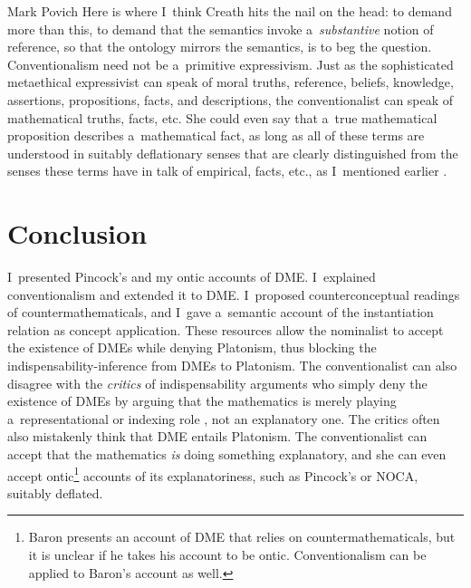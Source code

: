 \begin{artengenv}{Mark Povich}
Here is where I~think Creath
\parencite*[][]{creath_benacerraf_1980} %
 hits the nail on the head: to demand more than this, to demand that the semantics invoke a~\textit{substantive} notion of reference, so that the ontology mirrors the semantics, is to beg the question. Conventionalism need not be a~primitive expressivism. Just as the sophisticated metaethical expressivist 
\parencites[e.g.,][]{blackburn_essays_1993}{kalderon_quasi-realism_2005}
 can speak of moral truths, reference, beliefs, knowledge, assertions, propositions, facts, and descriptions, the conventionalist can speak of mathematical truths, facts, etc. She could even say that a~true mathematical proposition describes a~mathematical fact, as long as all of these terms are understood in suitably deflationary senses that are clearly distinguished from the senses these terms have in talk of empirical, facts, etc., as I~mentioned earlier 
\parencites[][]{thomasson_norms_2020}[see also][]{baker_mathematical_2009}.%


\section{Conclusion}
I~presented Pincock's
\parencite*[][]{pincock_abstract_2015} %
 and my 
\parencite[][]{povich_narrow_2021} %
 ontic accounts of DME. I~explained conventionalism and extended it to DME. I~proposed counterconceptual readings of countermathematicals, and I~gave a~semantic account of the instantiation relation as concept application. These resources allow the nominalist to accept the existence of DMEs while denying Platonism, thus blocking the indispensability-inference from DMEs to Platonism. The conventionalist can also disagree with the \textit{critics} of indispensability arguments who simply deny the existence of DMEs by arguing that the mathematics is merely playing a~representational 
\parencite[][]{saatsi_enhanced_2011} %
 or indexing role 
\parencite[][]{melia_weaseling_2000}, %
 not an explanatory one. The critics often also mistakenly think that DME entails Platonism. The conventionalist can accept that the mathematics \textit{is} doing something explanatory, and she can even accept ontic\footnote{Baron 
\parencite*[][]{baron_counterfactual_2020} %
 presents an account of DME that relies on countermathematicals, but it is unclear if he takes his account to be ontic. Conventionalism can be applied to Baron's account as well.} accounts of its explanatoriness, such as Pincock's or NOCA, suitably deflated.


\end{artengenv}
